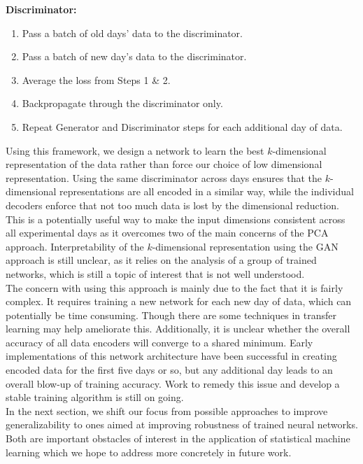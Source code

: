 \documentclass[12pt]{article}
\begin{document}
  \textbf{Discriminator:} \\
  \begin{enumerate}
    \item Pass a batch of old days' data to the discriminator.
    \item Pass a batch of new day's data to the discriminator.
    \item Average the loss from Steps 1 \& 2.
    \item Backpropagate through the discriminator only.
    \item Repeat Generator and Discriminator steps for each additional day of data.
  \end{enumerate}
\indent Using this framework, we design a network to learn the best $k$-dimensional representation of the data rather than force our choice of low dimensional representation. Using the same discriminator across days ensures that the $k$-dimensional representations are all encoded in a similar way, while the individual decoders enforce that not too much data is lost by the dimensional reduction. This is a potentially useful way to make the input dimensions consistent across all experimental days as it overcomes two of the main concerns of the PCA approach. Interpretability of the $k$-dimensional representation using the GAN approach is still unclear, as it relies on the analysis of a group of trained networks, which is still a topic of interest that is not well understood. \\
The concern with using this approach is mainly due to the fact that it is fairly complex. It requires training a new network for each new day of data, which can potentially be time consuming. Though there are some techniques in transfer learning may help ameliorate this. Additionally, it is unclear whether the overall accuracy of all data encoders will converge to a shared minimum. Early implementations of this network architecture have been successful in creating encoded data for the first five days or so, but any additional day leads to an overall blow-up of training accuracy. Work to remedy this issue and develop a stable training algorithm is still on going. \\
\indent In the next section, we shift our focus from possible approaches to improve generalizability to ones aimed at improving robustness of trained neural networks. Both are important obstacles of interest in the application of statistical machine learning which we hope to address more concretely in future work.
\end{document}
